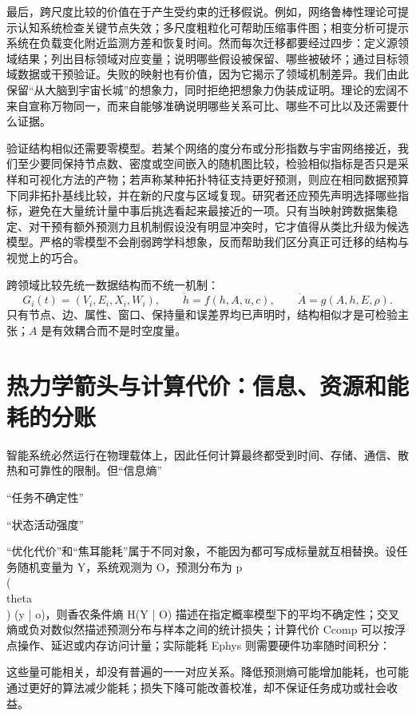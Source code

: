 最后，跨尺度比较的价值在于产生受约束的迁移假说。例如，网络鲁棒性理论可提示认知系统检查关键节点失效；多尺度粗粒化可帮助压缩事件图；相变分析可提示系统在负载变化附近监测方差和恢复时间。然而每次迁移都要经过四步：定义源领域结果；列出目标领域对应变量；说明哪些假设被保留、哪些被破坏；通过目标领域数据或干预验证。失败的映射也有价值，因为它揭示了领域机制差异。我们由此保留“从大脑到宇宙长城”的想象力，同时拒绝把想象力伪装成证明。理论的宏阔不来自宣称万物同一，而来自能够准确说明哪些关系可比、哪些不可比以及还需要什么证据。

验证结构相似还需要零模型。若某个网络的度分布或分形指数与宇宙网络接近，我们至少要同保持节点数、密度或空间嵌入的随机图比较，检验相似指标是否只是采样和可视化方法的产物；若声称某种拓扑特征支持更好预测，则应在相同数据预算下同非拓扑基线比较，并在新的尺度与区域复现。研究者还应预先声明选择哪些指标，避免在大量统计量中事后挑选看起来最接近的一项。只有当映射跨数据集稳定、对干预有额外预测力且机制假设没有明显冲突时，它才值得从类比升级为候选模型。严格的零模型不会削弱跨学科想象，反而帮助我们区分真正可迁移的结构与视觉上的巧合。

跨领域比较先统一数据结构而不统一机制：
\begin{equation}
G_i(t)=(V_i,E_i,X_i,W_i),\qquad \dot h=f(h,A,u,c),\qquad \dot A=g(A,h,E,\rho).
\end{equation}
只有节点、边、属性、窗口、保持量和误差界均已声明时，结构相似才是可检验主张；$A$ 是有效耦合而不是时空度量。

\section{热力学箭头与计算代价：信息、资源和能耗的分账}

\label{sec:geometric_evolution_of_thermodynamic_arrow}

智能系统必然运行在物理载体上，因此任何计算最终都受到时间、存储、通信、散热和可靠性的限制。但“信息熵”

“任务不确定性”

“状态活动强度”

“优化代价”和“焦耳能耗”属于不同对象，不能因为都可写成标量就互相替换。设任务随机变量为 Y，系统观测为 O，预测分布为 p\\(\\theta\\) (y | o)，则香农条件熵 H(Y | O) 描述在指定概率模型下的平均不确定性；交叉熵或负对数似然描述预测分布与样本之间的统计损失；计算代价 Ccomp 可以按浮点操作、延迟或内存访问计量；实际能耗 Ephys 则需要硬件功率随时间积分：

这些量可能相关，却没有普遍的一一对应关系。降低预测熵可能增加能耗，也可能通过更好的算法减少能耗；损失下降可能改善校准，却不保证任务成功或社会收益。

